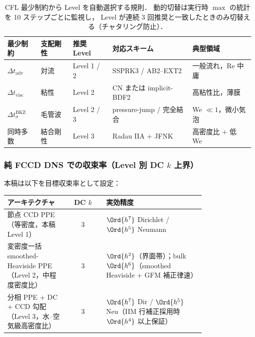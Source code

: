 \begin{table}[htbp]
\centering
\small
\begin{tabular}{@{}lllll@{}}
\hline
最少制約 & 支配剛性 & 推奨 Level & 対応スキーム & 典型領域 \\
\hline
$\Delta t_\text{adv}$ & 対流 &
  Level 1 / 2 & SSPRK3 / AB2--EXT2 &
  一般流れ，Re 中庸 \\
$\Delta t_\text{visc}$ & 粘性 &
  Level 2 & CN または implicit-BDF2 &
  高粘性比，薄膜 \\
$\Delta t_\sigma^\text{BKZ}$ & 毛管波 &
  Level 2 / 3 & pressure-jump / 完全結合 &
  We $\ll 1$，微小気泡 \\
同時多数 & 結合剛性 &
  Level 3 & Radau IIA + JFNK &
  高密度比 + 低 We \\
\hline
\end{tabular}
\caption{CFL 最少制約から Level を自動選択する規則．
動的切替は実行時 $\max$ の統計を 10 ステップごとに監視し，
Level が連続 3 回推奨と一致したときのみ切替える（チャタリング防止）．}
\label{tab:level_trigger}
\end{table}

\subsubsection{純 FCCD DNS での収束率（Level 別 DC $k$ 上界）}
\label{sec:dc_pure_fccd_convergence}

本稿は以下を目標収束率として設定：
\begin{center}
\small
\begin{tabular}{@{}p{0.30\linewidth}cp{0.50\linewidth}@{}}
\hline
アーキテクチャ & DC $k$ & 実効精度 \\
\hline
節点 CCD PPE（等密度，本稿 Level 1）& 3 & $\Ord{h^7}$ Dirichlet / $\Ord{h^5}$ Neumann \\
変密度一括 smoothed-Heaviside PPE（Level 2，中程度密度比）& 3 & $\Ord{h^2}$（界面帯）；bulk $\Ord{h^6}$（smoothed Heaviside + GFM 補正律速）\\
分相 PPE + DC + CCD 勾配（Level 3，水--空気級高密度比）& 3 & $\Ord{h^7}$ Dir / $\Ord{h^5}$ Neu（IIM 行補正採用時 $\Ord{h^4}$ 以上保証）\\
\hline
\end{tabular}
\end{center}


